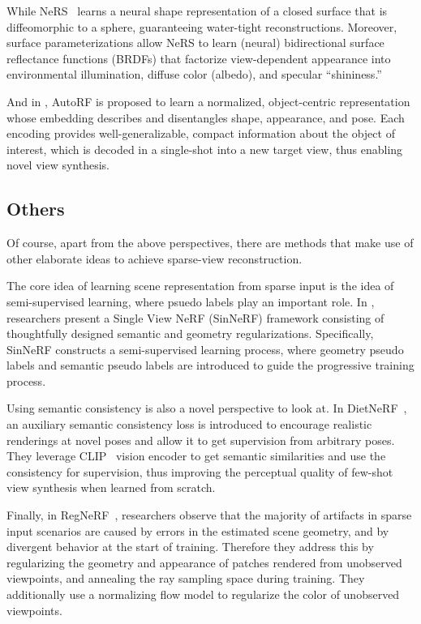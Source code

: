 \documentclass[10pt,twocolumn,letterpaper]{article}
\begin{document}
While NeRS~\cite{zhang2021ners} learns a neural shape representation of a closed surface that is diffeomorphic to a sphere, guaranteeing water-tight reconstructions. Moreover, surface parameterizations allow NeRS to learn (neural) bidirectional surface reflectance functions (BRDFs) that factorize view-dependent appearance into environmental illumination, diffuse color (albedo), and specular “shininess.”

And in \cite{mueller2022autorf}, AutoRF is proposed to learn a normalized, object-centric representation whose embedding describes and disentangles shape, appearance, and pose. Each encoding provides well-generalizable, compact information about the object of interest, which is decoded in a single-shot into a new target view, thus enabling novel view synthesis.

\subsection{Others}

Of course, apart from the above perspectives, there are methods that make use of other elaborate ideas to achieve sparse-view reconstruction.

The core idea of learning scene representation from sparse input is the idea of semi-supervised learning, where psuedo labels play an important role. 
In \cite{Xu_2022_SinNeRF}, researchers present a Single View NeRF (SinNeRF) framework consisting of thoughtfully designed semantic and geometry regularizations.
Specifically, SinNeRF constructs a semi-supervised learning process, where geometry pseudo labels and semantic pseudo labels are introduced to guide the progressive training process.

Using semantic consistency is also a novel perspective to look at. In DietNeRF~\cite{Jain_2021_ICCV}, an auxiliary semantic consistency loss is introduced to encourage realistic renderings at novel poses and allow it to get supervision from arbitrary poses. They leverage CLIP~\cite{DBLP:journals/corr/abs-2103-00020} vision encoder to get semantic similarities and use the consistency for supervision, thus improving the perceptual quality of few-shot view synthesis when learned from scratch.

Finally, in RegNeRF~\cite{Niemeyer2021Regnerf}, researchers observe that the majority of artifacts in sparse input scenarios are caused by errors in the estimated scene geometry, and by divergent behavior at the start of training. Therefore they address this by regularizing the geometry and appearance of patches rendered from unobserved viewpoints, and annealing the ray sampling space during training. They additionally use a normalizing flow model to regularize the color of unobserved viewpoints.
\end{document}
